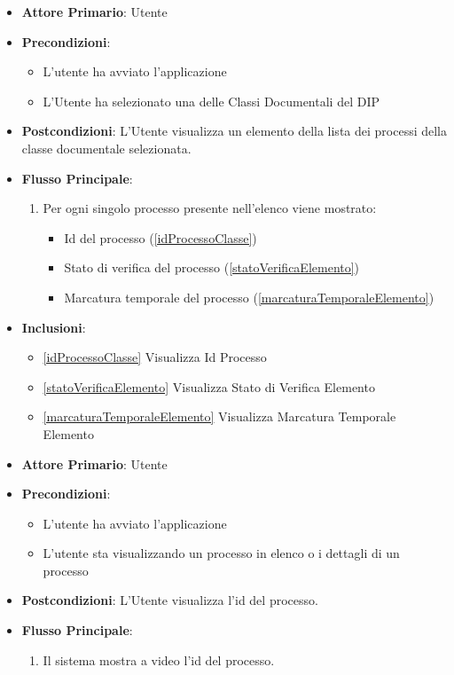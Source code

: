 \begin{itemize}
    \item \textbf{Attore Primario}: Utente
    \item \textbf{Precondizioni}:
    \begin{itemize}
        \item L'utente ha avviato l'applicazione
        \item L'Utente ha selezionato una delle Classi Documentali del DIP
    \end{itemize}
    \item \textbf{Postcondizioni}: L'Utente visualizza un elemento della lista dei processi della classe documentale selezionata.
    \item \textbf{Flusso Principale}:
    \begin{enumerate}
        \item Per ogni singolo processo presente nell'elenco viene mostrato:
        \begin{itemize}
            \item Id del processo (\ref{idProcessoClasse})
            \item Stato di verifica del processo (\ref{statoVerificaElemento})
            \item Marcatura temporale del processo (\ref{marcaturaTemporaleElemento})
        \end{itemize}
    \end{enumerate}
    \item \textbf{Inclusioni}:
    \begin{itemize}
        \item \ref{idProcessoClasse} Visualizza Id Processo
        \item \ref{statoVerificaElemento} Visualizza Stato di Verifica Elemento
        \item \ref{marcaturaTemporaleElemento} Visualizza Marcatura Temporale Elemento
    \end{itemize}
\end{itemize}


\begin{itemize}
    \item \textbf{Attore Primario}: Utente
    \item \textbf{Precondizioni}: \begin{itemize}
        \item L'utente ha avviato l'applicazione
        \item L'utente sta visualizzando un processo in elenco o i dettagli di un processo
    \end{itemize}
    \item \textbf{Postcondizioni}: L'Utente visualizza l'id del processo.
    \item \textbf{Flusso Principale}:
          \begin{enumerate}
              \item Il sistema mostra a video l'id del processo.
          \end{enumerate}
\end{itemize}


